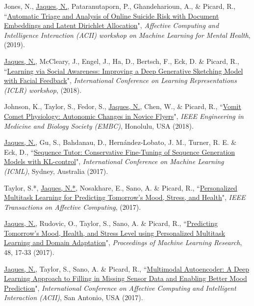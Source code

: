 \documentclass[paper=letter,fontsize=11pt]{scrartcl} %
\newcommand{\PaperEntry}[6]{
		\noindent #1, ``\href{#6}{#2}", \textit{#3}, #4 (#5).}
\begin{document}
\begin{etaremune}
\item \PaperEntry{Jones, N., \underline{Jaques, N.}, Pataranutaporn, P., Ghandeharioun, A., \& Picard, R.}{Automatic Triage and Analysis of Online Suicide Risk with Document Embeddings and Latent Dirichlet Allocation}{Affective Computing and Intelligence Interaction (ACII) workshop on Machine Learning for Mental Health}{}{2019}{https://drive.google.com/file/d/1muoFj_BXJUZCRyjCLEX9DxKOz7b9nKtj/view?usp=sharing}

\item \PaperEntry{\underline{Jaques, N.}, McCleary, J., Engel, J., Ha, D., Bertsch, F.,  Eck, D. \& Picard, R.}{Learning via Social Awareness: Improving a Deep Generative Sketching Model with Facial Feedback}{International Conference on Learning Representations (ICLR) workshop}{}{2018}{https://arxiv.org/pdf/1802.04877.pdf}

\item \PaperEntry{Johnson, K., Taylor, S., Fedor, S., \underline{Jaques, N.}, Chen, W., \& Picard, R.}{Vomit Comet Physiology: Autonomic Changes in Novice Flyers}{IEEE Engineering in Medicine and Biology Society (EMBC)}{Honolulu, USA}{2018}{https://dspace.mit.edu/bitstream/handle/1721.1/123805/18.Johnson-etal_EMBC18_VomitComet.pdf?sequence=1&isAllowed=y}

\item \PaperEntry{\underline{Jaques, N.}, Gu, S., Bahdanau, D., Hern\'{a}ndez-Lobato, J. M., Turner, R. E. \& Eck, D.}{Sequence Tutor: Conservative Fine-Tuning of Sequence Generation Models with KL-control}{International Conference on Machine Learning (ICML)}{Sydney, Australia}{2017}{https://arxiv.org/pdf/1611.02796.pdf}

\item \PaperEntry{Taylor, S.*, \underline{Jaques, N.*}, Nosakhare, E., Sano, A. \& Picard, R.}{Personalized Multitask Learning for Predicting Tomorrow's Mood, Stress, and Health}{IEEE Transactions on Affective Computing}{}{2017}{https://affect.media.mit.edu/pdfs/17.TaylorJaques-PredictingTomorrowsMoods.pdf}

\item \PaperEntry{\underline{Jaques, N.}, Rudovic, O., Taylor, S., Sano, A. \& Picard, R.}{Predicting Tomorrow’s Mood, Health, and Stress Level using Personalized Multitask Learning and Domain Adaptation}{Proceedings of Machine Learning Research}{48, 17-33}{2017}{http://proceedings.mlr.press/v66/jaques17a/jaques17a.pdf}

\item \PaperEntry{\underline{Jaques, N.}, Taylor, S., Sano, A. \& Picard, R.}{Multimodal Autoencoder: A Deep Learning Approach to Filling in Missing Sensor Data and Enabling Better Mood Prediction}{International Conference on Affective Computing and Intelligent Interaction (ACII)}{San Antonio, USA}{2017}{https://affect.media.mit.edu/pdfs/17.Jaques_autoencoder_ACII.pdf}


\end{etaremune}
\end{document}
